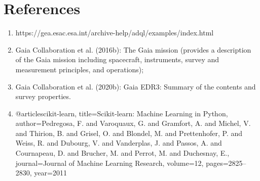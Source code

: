 \documentclass[12pt]{amsart}
\begin{document}
\section*{References}
\begin{enumerate}
\item https://gea.esac.esa.int/archive-help/adql/examples/index.html\\
\item Gaia Collaboration et al. (2016b): The Gaia mission (provides a description of the Gaia mission including spacecraft, instruments, survey and measurement principles, and operations);
\item Gaia Collaboration et al. (2020b): Gaia EDR3: Summary of the contents and survey properties.
\item @article{scikit-learn,
 title={Scikit-learn: Machine Learning in {P}ython},
 author={Pedregosa, F. and Varoquaux, G. and Gramfort, A. and Michel, V.
         and Thirion, B. and Grisel, O. and Blondel, M. and Prettenhofer, P.
         and Weiss, R. and Dubourg, V. and Vanderplas, J. and Passos, A. and
         Cournapeau, D. and Brucher, M. and Perrot, M. and Duchesnay, E.},
 journal={Journal of Machine Learning Research},
 volume={12},
 pages={2825--2830},
 year={2011}
}
\end{enumerate}
\end{document}
